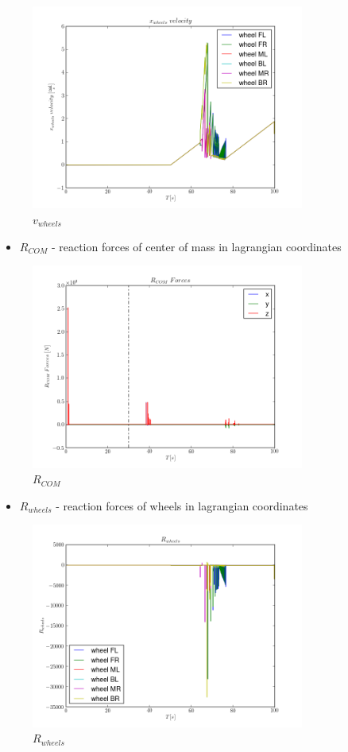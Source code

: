 \begin{figure}[H]
  \centering
    \includegraphics[width=0.8\textwidth]{vWHEELS7}
  \caption{$v_{wheels}$}
\end{figure}

\begin{itemize}
  \item $R_{COM}$ - reaction forces of center of mass in lagrangian coordinates
\end{itemize}

\begin{figure}[H]
  \centering
    \includegraphics[width=0.8\textwidth]{pCOM7}
  \caption{$R_{COM}$}
\end{figure}

\begin{itemize}
  \item $R_{wheels}$ - reaction forces of wheels in lagrangian coordinates
\end{itemize}

\begin{figure}[H]
  \centering
    \includegraphics[width=0.8\textwidth]{pWHEELS7}
  \caption{$R_{wheels}$}
\end{figure}
